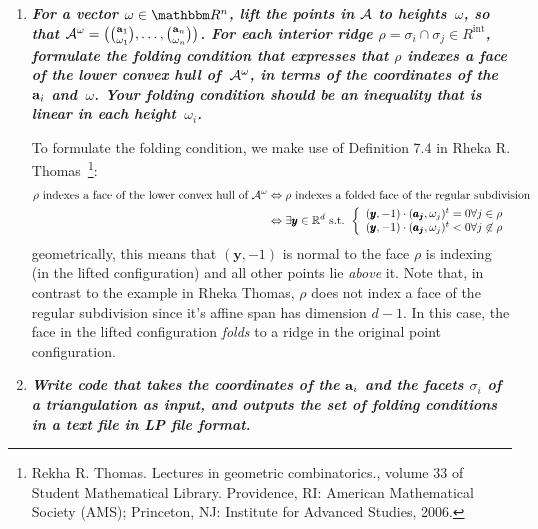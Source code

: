 \begin{enumerate}
  \item
      \textbf{\textit{For a vector $\omega\in\RR^n$, lift the points in $\mathcal{A}$ to heights~$\omega$, so that $\mathcal{A}^\omega=\big(\binom{\mathbf{a}_1}{\omega_1},\dots,\binom{\mathbf{a}_n}{\omega_n}\big)$. For each interior ridge $\rho=\sigma_i\cap\sigma_j\in R^{\text{int}}$, formulate the folding condition that expresses that $\rho$ indexes a face of the lower convex hull of~$\mathcal{A}^\omega$, in terms of the coordinates of the~$\mathbf{a}_i$ and~$\omega$. Your folding condition should be an inequality that is linear in each height~$\omega_i$.}}

To formulate the folding condition, we make use of Definition 7.4 in Rheka R. Thomas~\footnote{Rekha R. Thomas. Lectures in geometric combinatorics., volume 33 of Student Mathematical Library. Providence, RI: American Mathematical Society (AMS); Princeton, NJ: Institute for Advanced Studies, 2006.}:
        \begin{equation*}
            \begin{split}
                \rho \text{ indexes a face of the lower convex hull of } \mathcal{A}^\omega & \Leftrightarrow \rho \text{ indexes a folded face of the regular subdivision } \\
                & \Leftrightarrow \exists \pmb{y} \in \mathbb{R}^{d} \text{ s.t. } \left\lbrace \begin{array}{l} (\pmb{y}, -1) \cdot (\pmb{a_j}, \omega_j)^t = 0 \forall j \in \rho \\ (\pmb{y}, -1) \cdot (\pmb{a_j}, \omega_j)^t < 0 \forall j \not\in \rho \end{array} \right.
            \end{split}
        \end{equation*}
    geometrically, this means that $(\pmb{y}, -1)$ is normal to the face $\rho$ is indexing (in the lifted configuration) and all other points lie \textit{above} it.
    Note that, in contrast to the example in Rheka Thomas, $\rho$ does not index a face of the regular subdivision since it's affine span has dimension $d-1$. 
    In this case, the face in the lifted configuration \textit{folds} to a ridge in the original point configuration.

  \item
        \textbf{\textit{Write code that takes the coordinates of the $\mathbf{a}_i$ and the facets $\sigma_i$ of a triangulation as input, and outputs the set of folding conditions in a text file in LP file format.}}


\end{enumerate}
